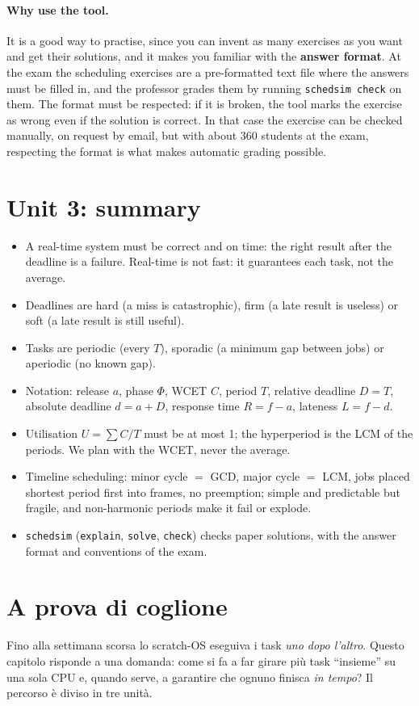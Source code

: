 \paragraph{Why use the tool.} It is a good way to practise, since you can invent as many exercises as you want and get their solutions, and it makes you familiar with the \textbf{answer format}. At the exam the scheduling exercises are a pre-formatted text file where the answers must be filled in, and the professor grades them by running \texttt{schedsim check} on them. The format must be respected: if it is broken, the tool marks the exercise as wrong even if the solution is correct. In that case the exercise can be checked manually, on request by email, but with about 360 students at the exam, respecting the format is what makes automatic grading possible.

\section{Unit 3: summary}
\begin{itemize}
    \item A real-time system must be correct and on time: the right result after the deadline is a failure. Real-time is not fast: it guarantees each task, not the average.
    \item Deadlines are hard (a miss is catastrophic), firm (a late result is useless) or soft (a late result is still useful).
    \item Tasks are periodic (every $T$), sporadic (a minimum gap between jobs) or aperiodic (no known gap).
    \item Notation: release $a$, phase $\Phi$, WCET $C$, period $T$, relative deadline $D = T$, absolute deadline $d = a + D$, response time $R = f - a$, lateness $L = f - d$.
    \item Utilisation $U = \sum C/T$ must be at most 1; the hyperperiod is the LCM of the periods. We plan with the WCET, never the average.
    \item Timeline scheduling: minor cycle $=$ GCD, major cycle $=$ LCM, jobs placed shortest period first into frames, no preemption; simple and predictable but fragile, and non-harmonic periods make it fail or explode.
    \item \texttt{schedsim} (\texttt{explain}, \texttt{solve}, \texttt{check}) checks paper solutions, with the answer format and conventions of the exam.
\end{itemize}


\section{A prova di coglione}
Fino alla settimana scorsa lo scratch-OS eseguiva i task \emph{uno dopo l'altro}. Questo capitolo risponde a una domanda: come si fa a far girare più task ``insieme'' su una sola CPU e, quando serve, a garantire che ognuno finisca \emph{in tempo}? Il percorso è diviso in tre unità.

